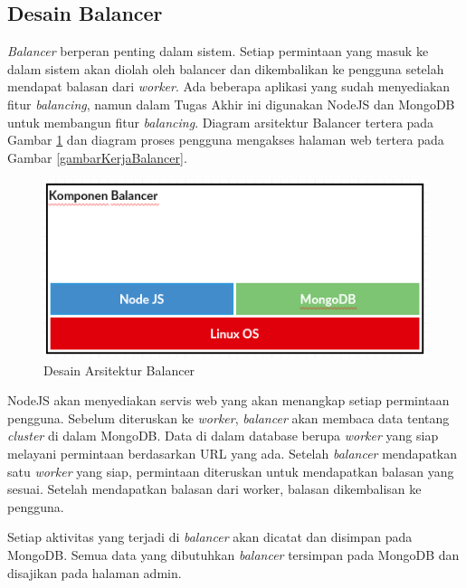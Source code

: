 \documentclass{ta-its}
\begin{document}
			    
			    
			
			\subsection{Desain Balancer}
			    \textit{Balancer} berperan penting dalam sistem. Setiap permintaan yang masuk ke dalam sistem akan diolah oleh balancer dan dikembalikan ke pengguna setelah mendapat balasan dari \textit{worker}. Ada beberapa aplikasi yang sudah menyediakan fitur \textit{balancing}, namun dalam Tugas Akhir ini digunakan NodeJS dan MongoDB untuk membangun fitur \textit{balancing}. Diagram arsitektur Balancer tertera pada Gambar \ref{gambarArsitekturBalancer} dan diagram proses pengguna mengakses halaman web tertera pada Gambar \ref{gambarKerjaBalancer}. 
			    
			    \begin{figure}[] %
			    	\centering
			    	\includegraphics[width=\linewidth]{contoh_img/kompbalancer}
			    	\caption{Desain Arsitektur Balancer}
			    	\label{gambarArsitekturBalancer}
			    \end{figure}
			    
			    NodeJS akan menyediakan servis web yang akan menangkap setiap permintaan pengguna. Sebelum diteruskan ke \textit{worker}, \textit{balancer} akan membaca data tentang \textit{cluster} di dalam MongoDB. Data di dalam database berupa \textit{worker} yang siap melayani permintaan berdasarkan URL yang ada. Setelah \textit{balancer} mendapatkan satu \textit{worker} yang siap, permintaan diteruskan untuk mendapatkan balasan yang sesuai. Setelah mendapatkan balasan dari worker, balasan dikembalisan ke pengguna.
			    
			    Setiap aktivitas yang terjadi di \textit{balancer} akan dicatat dan disimpan pada MongoDB. Semua data yang dibutuhkan \textit{balancer} tersimpan pada MongoDB dan disajikan pada halaman admin.
			    			    
\end{document}
